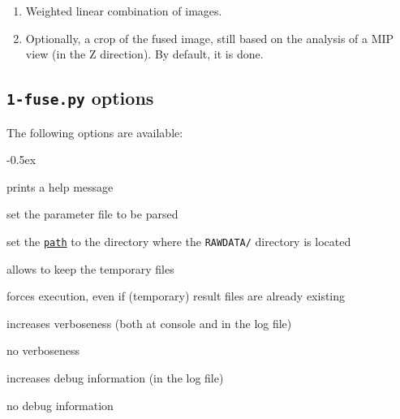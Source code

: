 \begin{enumerate}
\item \label{it:fusion:combination} Weighted linear combination of images.

\item  \label{it:fusion:crop:2} Optionally, a crop of the fused image, still based on the analysis of a MIP view (in the Z direction). By default, it is done.
\end{enumerate}




\subsection{\texttt{1-fuse.py} options}

The following options are available:
\begin{description}
  \itemsep -0.5ex
\item[\texttt{-h}] prints a help message
\item[\texttt{-p \underline{file}}] set the parameter file to be parsed
\item[\texttt{-e \underline{path}}] set the
  \texttt{\underline{path}} to the directory where the
  \texttt{RAWDATA/} directory is located
\item[\texttt{-k}] allows to keep the temporary files
\item[\texttt{-f}] forces execution, even if (temporary) result files
  are already existing
\item[\texttt{-v}] increases verboseness (both at console and in the
  log file)
\item[\texttt{-nv}] no verboseness
\item[\texttt{-d}]  increases debug information (in the
  log file)
\item[\texttt{-nd}] no debug information
\end{description}



